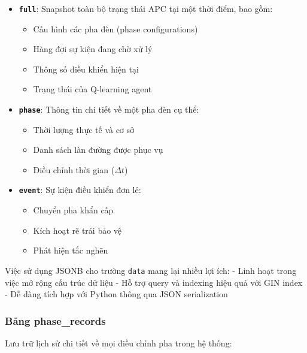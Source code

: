 \begin{itemize}
    \item \textbf{\texttt{full}}: Snapshot toàn bộ trạng thái APC tại một thời điểm, bao gồm:
        \begin{itemize}
            \item Cấu hình các pha đèn (phase configurations)
            \item Hàng đợi sự kiện đang chờ xử lý
            \item Thông số điều khiển hiện tại
            \item Trạng thái của Q-learning agent
        \end{itemize}
    
    \item \textbf{\texttt{phase}}: Thông tin chi tiết về một pha đèn cụ thể:
        \begin{itemize}
            \item Thời lượng thực tế và cơ sở
            \item Danh sách làn đường được phục vụ
            \item Điều chỉnh thời gian ($\Delta t$)
        \end{itemize}
    
    \item \textbf{\texttt{event}}: Sự kiện điều khiển đơn lẻ:
        \begin{itemize}
            \item Chuyển pha khẩn cấp
            \item Kích hoạt rẽ trái bảo vệ
            \item Phát hiện tắc nghẽn
        \end{itemize}
\end{itemize}

Việc sử dụng JSONB cho trường \texttt{data} mang lại nhiều lợi ích:
- Linh hoạt trong việc mở rộng cấu trúc dữ liệu
- Hỗ trợ query và indexing hiệu quả với GIN index
- Dễ dàng tích hợp với Python thông qua JSON serialization

\subsubsection{Bảng phase\_records}

Lưu trữ lịch sử chi tiết về mọi điều chỉnh pha trong hệ thống:

